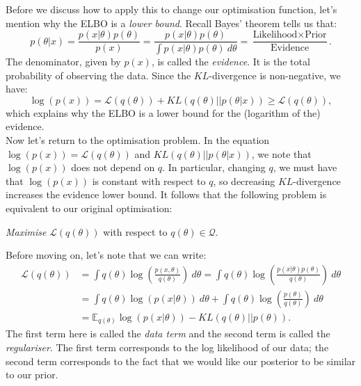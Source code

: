 Before we discuss how to apply this to change our optimisation function, let's mention why the ELBO is a \textit{lower bound}. Recall Bayes' theorem tells us that:
\begin{equation*}
p(\theta | x) = \frac{p(x | \theta) p(\theta)}{p(x)} = \frac{p(x | \theta) p(\theta)}{\displaystyle \int p(x|\theta) p(\theta)\ d\theta} = \frac{\text{Likelihood} \times \text{Prior}}{\text{Evidence}}.
\end{equation*}
The denominator, given by $p(x)$, is called the \textit{evidence}. It is the total probability of observing the data. Since the $KL$-divergence is non-negative, we have:
\begin{equation*}
\log(p(x)) = \mathcal{L}(q(\theta)) + KL(q(\theta) || p(\theta | x)) \geq \mathcal{L}(q(\theta)),
\end{equation*} 
which explains why the ELBO is a lower bound for the (logarithm of the) evidence.\\

Now let's return to the optimisation problem. In the equation $\log(p(x)) = \mathcal{L}(q(\theta))$ and $KL(q(\theta) || p(\theta | x))$, we note that $\log(p(x))$ does not depend on $q$. In particular, changing $q$, we must have that $\log(p(x))$ is constant with respect to $q$, so decreasing $KL$-divergence increases the evidence lower bound. It follows that the following problem is equivalent to our original optimisation:
\begin{framed}
\begin{center}
\textit{Maximise} $\mathcal{L}(q(\theta))$ with respect to $q(\theta) \in \mathcal{Q}$.
\end{center}
\end{framed}

Before moving on, let's note that we can write:
\begin{align*}
\mathcal{L}(q(\theta)) &= \int q(\theta) \log\left( \frac{p(x,\theta)}{q(\theta)} \right)\ d\theta = \int q(\theta) \log\left( \frac{p(x | \theta) p(\theta)}{q(\theta)} \right)\ d\theta\\[1.5ex]
&= \int q(\theta) \log(p(x|\theta))\ d\theta + \int q(\theta) \log\left( \frac{p(\theta)}{q(\theta)} \right)\ d\theta\\[1.5ex]
&= \mathbb{E}_{q(\theta)} \log(p(x|\theta)) - KL(q(\theta) || p(\theta)).
\end{align*}
The first term here is called the \textit{data term} and the second term is called the \textit{regulariser}. The first term corresponds to the log likelihood of our data; the second term corresponds to the fact that we would like our posterior to be similar to our prior.


